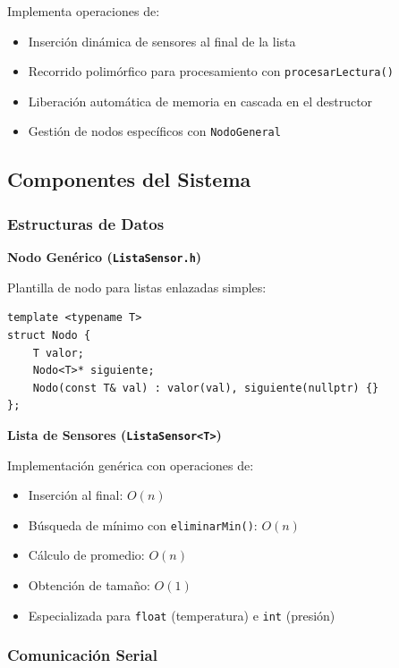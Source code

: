 \documentclass[conference]{IEEEtran}
\begin{document}
Implementa operaciones de:
\begin{itemize}
    \item Inserción dinámica de sensores al final de la lista
    \item Recorrido polimórfico para procesamiento con \texttt{procesarLectura()}
    \item Liberación automática de memoria en cascada en el destructor
    \item Gestión de nodos específicos con \texttt{NodoGeneral}
\end{itemize}

\subsection{Componentes del Sistema}

\subsubsection{Estructuras de Datos}

\textbf{Nodo Genérico (\texttt{ListaSensor.h})}

Plantilla de nodo para listas enlazadas simples:

\vspace{0.3cm}
\begin{lstlisting}
template <typename T>
struct Nodo {
    T valor;
    Nodo<T>* siguiente;
    Nodo(const T& val) : valor(val), siguiente(nullptr) {}
};
\end{lstlisting}
\vspace{0.3cm}

\textbf{Lista de Sensores (\texttt{ListaSensor<T>})}

Implementación genérica con operaciones de:
\begin{itemize}
    \item Inserción al final: $O(n)$
    \item Búsqueda de mínimo con \texttt{eliminarMin()}: $O(n)$
    \item Cálculo de promedio: $O(n)$
    \item Obtención de tamaño: $O(1)$
    \item Especializada para \texttt{float} (temperatura) e \texttt{int} (presión)
\end{itemize}

\subsubsection{Comunicación Serial}
\end{document}
